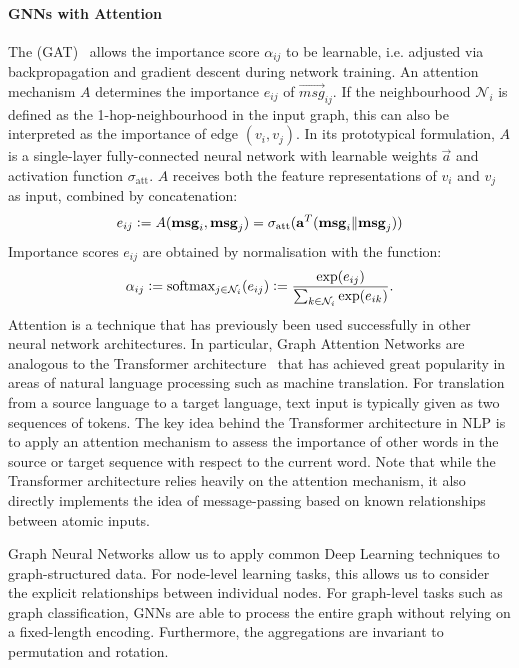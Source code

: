 \documentclass[
	fontsize=10pt, %
	twoside=true, %
	secnumdepth=1, %
  toc=indentunnumbered %
]{kaobook}
\begin{document}
\paragraph{GNNs with Attention} The  (GAT)~\cite{velickovic_graph_2018} allows the importance score $\alpha_{ij}$ to be learnable, i.e.
adjusted via backpropagation and gradient descent during network training. An
attention mechanism $A$ determines the importance $e_{ij}$ of $\vec{msg}_{ij}$.
If the neighbourhood $\mathcal{N}_i$ is defined as the 1-hop-neighbourhood in
the input graph, this can also be interpreted as the importance of edge $(v_i,
v_j)$. In its prototypical formulation, $A$ is a single-layer fully-connected
neural network with learnable weights $\vec a$ and activation function
$\sigma_{\text{att}}$. $A$ receives
both the feature representations of $v_i$ and $v_j$ as input, combined by
concatenation:
\begin{align}
  e_{ij} := A(\mathbf{msg}_i, \mathbf{msg}_j) = \sigma_{\text{att}}(\mathbf{a}^T( \mathbf{msg}_i \| \mathbf{msg}_j))
  \label{eq:graph-attention}
\end{align}
Importance scores $e_{ij}$ are obtained by normalisation with the  function:
\begin{align}
  \alpha_{ij} := \text{softmax}_{j \in \mathcal{N}_i}(e_{ij}) := \frac{\exp(e_{ij})}{\sum_{k \in \mathcal{N}_i} \exp(e_{ik})}.
  \label{eq:softmax}
\end{align}
Attention is a technique that has previously been used successfully in other
neural network architectures. In particular, Graph Attention Networks are
analogous to the Transformer architecture~\cite{vaswani_AttentionAllYou_2017}
that has achieved great popularity in areas of natural language processing such as machine translation.
For translation from a source language
to a target language, text input is typically given as two sequences of tokens.
The key idea behind the Transformer architecture in NLP is to apply an attention
mechanism to assess the importance of other words in the source or target
sequence with respect to the current word.
Note that while the Transformer architecture relies heavily on the attention
mechanism, it also directly implements the idea of message-passing based on
known relationships between atomic inputs.

Graph Neural Networks allow us to apply common Deep Learning techniques to
graph-structured data. For node-level learning tasks, this allows us to consider
the explicit relationships between individual nodes. For graph-level tasks such
as graph classification, GNNs are able to process the entire graph without
relying on a fixed-length encoding. Furthermore, the aggregations are invariant
to permutation and rotation.
\end{document}
